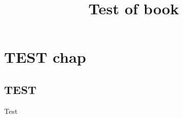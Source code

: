 \documentclass{book}
\title{Test of book}
\begin{document}
    \tableofcontents
    
    
    
    \chapter{TEST chap}
    \section{TEST}
    Test
\end{document}
